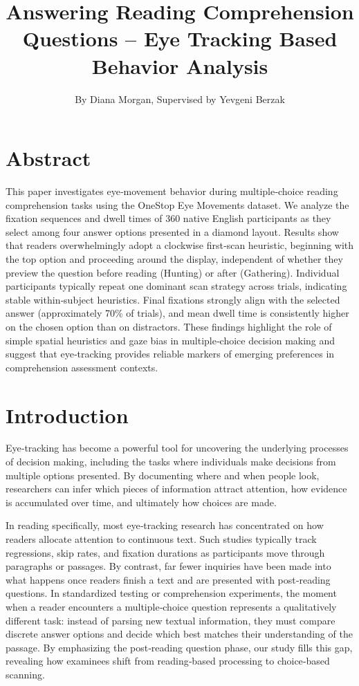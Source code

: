 \documentclass{article}
\title{Answering Reading Comprehension Questions – Eye Tracking Based Behavior Analysis}
\date{}
\author{By Diana Morgan, Supervised by Yevgeni Berzak}
\begin{document}
\maketitle


\section{Abstract}
This paper investigates eye‐movement behavior during multiple‐choice reading comprehension tasks using the OneStop Eye Movements dataset. We analyze the fixation sequences and dwell times of 360 native English participants as they select among four answer options presented in a diamond layout. Results show that readers overwhelmingly adopt a clockwise first‐scan heuristic, beginning with the top option and proceeding around the display, independent of whether they preview the question before reading (Hunting) or after (Gathering). Individual participants typically repeat one dominant scan strategy across trials, indicating stable within‐subject heuristics. Final fixations strongly align with the selected answer (approximately 70\% of trials), and mean dwell time is consistently higher on the chosen option than on distractors. These findings highlight the role of simple spatial heuristics and gaze bias in multiple‐choice decision making and suggest that eye‐tracking provides reliable markers of emerging preferences in comprehension assessment contexts.

\section{Introduction}
    Eye‐tracking has become a powerful tool for uncovering the underlying processes of decision making, including the tasks where individuals make decisions from multiple options presented. By documenting where and when people look, researchers can infer which pieces of information attract attention, how evidence is accumulated over time, and ultimately how choices are made.

    In reading specifically, most eye‐tracking research has concentrated on how readers allocate attention to continuous text. Such studies typically track regressions, skip rates, and fixation durations as participants move through paragraphs or passages. By contrast, far fewer inquiries have been made into what happens once readers finish a text and are presented with post‐reading questions. In standardized testing or comprehension experiments, the moment when a reader encounters a multiple‐choice question represents a qualitatively different task: instead of parsing new textual information, they must compare discrete answer options and decide which best matches their understanding of the passage. By emphasizing the post‐reading question phase, our study fills this gap, revealing how examinees shift from reading‐based processing to choice‐based scanning. 
    
\end{document}
